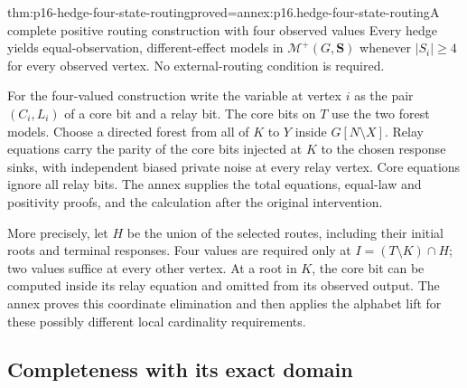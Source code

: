 \begin{hbtheorem}{thm:p16-hedge-four-state-routing}{proved=annex:p16.hedge-four-state-routing}{A complete positive routing construction with four observed values}
Every hedge yields equal-observation, different-effect models in
\(\mathcal M^+(G,\mathbf S)\) whenever \(|S_i|\geq4\) for every
observed vertex. No external-routing condition is required.

For the four-valued construction write the variable at vertex \(i\)
as the pair \((C_i,L_i)\) of a core bit and a relay bit. The core
bits on \(T\) use the two forest models. Choose a directed forest
from all of \(K\) to \(Y\) inside \(G[N\setminus X]\).
Relay equations carry the parity of the core bits injected at \(K\)
to the chosen response sinks, with independent biased private noise
at every relay vertex. Core equations ignore all relay bits.
The annex supplies the total equations, equal-law and positivity
proofs, and the calculation after the original intervention.

More precisely, let \(H\) be the union of the selected routes,
including their initial roots and terminal responses. Four values
are required only at \(I=(T\setminus K)\cap H\); two values
suffice at every other vertex. At a root in \(K\), the core bit
can be computed inside its relay equation and omitted from its
observed output. The annex proves this coordinate elimination and
then applies the alphabet lift for these possibly different local
cardinality requirements.
\end{hbtheorem}

\subsection{Completeness with its exact domain}

